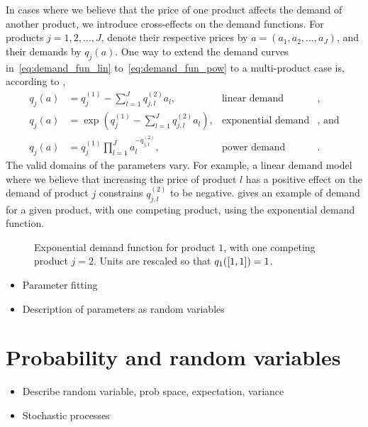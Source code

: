 \documentclass[main.tex]{subfiles}
\begin{document}
In cases where we believe that the price of one product affects the
demand of another product, we introduce cross-effects on the demand
functions. For products $j=1,2,\dots,J$, denote their respective prices by
$a=(a_1,a_2,\dots,a_J)$, and their demands by $q_j(a)$.
One way to extend the demand curves in~\eqref{eq:demand_fun_lin}
to~\eqref{eq:demand_fun_pow} to a multi-product case is, according to \cite{talluri2006theory},
\begin{align}
  q_j(a)&=q_{j}^{(1)}-\sum_{l=1}^Jq_{j,l}^{(2)}a_l,
  &\text{linear demand}&,\\
  q_j(a)&=\exp\left( q_{j}^{(1)}-\sum_{l=1}^Jq_{j,l}^{(2)}a_l
          \right),
  &\text{exponential demand}&\text{, and}\\
  q_j(a)&=q_j^{(1)}\prod_{l=1}^Ja_l^{-q_{j,l}^{(2)}},
  &\text{power demand}&.
\end{align}
The valid domains of the parameters vary. For example, a linear demand
model where we believe that increasing the price of product $l$ has a
positive effect on the demand of product $j$ constrains
$q_{j,l}^{(2)}$ to be negative. 
gives an example of demand for a given product, with one competing
product, using the exponential demand function.

\begin{figure}[htbp]
  \centering
  \caption{Exponential demand function for product $1$, with one
    competing product $j=2$.
    Units are rescaled so that $q_1(\left[1,1\right])=1$.
  }\label{fig:demand_exponential_two}
\end{figure}


\begin{itemize}
\item Parameter fitting
\item Description of parameters as random variables
\end{itemize}

\section{Probability and random variables}\label{sec:intro_prob_rvs}
\begin{itemize}
\item Describe random variable, prob space, expectation, variance
\item Stochastic processes
\end{itemize}
\end{document}
